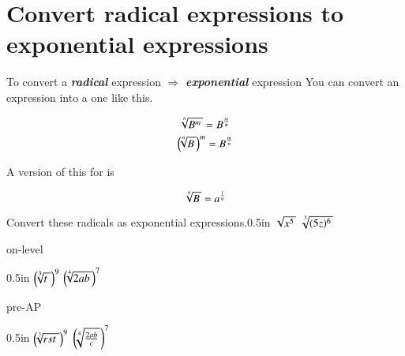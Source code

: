 \section*{Convert radical expressions to exponential expressions}

\begin{myConcept}{%
        To convert 
        a {\bfseries\itshape radical} expression 
        $\Longrightarrow$
        {\bfseries\itshape exponential} expression
    }%
    You can convert an  expression into a  one like this.
    \begin{myCenteredBox}[width=3in]
        \Large
        \[
            \myRoot[n]{B^m}
            =
            B ^ {\frac{m}{n}}
        \]
        \[
            \left(\hspace{-0.25em} \myRoot[n]{B} \right)^m
            =
            B ^ {\frac{m}{n}}
        \]
    \end{myCenteredBox}
    A version of this for  is
    \begin{myCenteredBox}[width=3in]
        \Large
        \[
            \myRoot[n]{B}
            =
            a ^ {\frac{1}{n}}
        \]
    \end{myCenteredBox}
\end{myConcept}




\begin{myProblems2}{Convert these radicals as exponential expressions.}{0.5in}
    {
        $\myRoot{x^5}$ 
    }
    {
        $\myRoot[3]{(5z)^6}$ 
    }
\end{myProblems2}




\begin{taggedblock}{on-level}
    \begin{myProblems2}{}{0.5in}
        {
            $\left(\hspace{-0.25em}   \myRoot[3]{t\,}   \right)^9$ 
        }
        {
            $\left(\hspace{-0.25em}   \myRoot[4]{2ab}   \right)^7$ 
        }
    \end{myProblems2}
\end{taggedblock}
\begin{taggedblock}{pre-AP}
    \begin{myProblems2}{}{0.5in}
        {
            $\left(\hspace{-0.25em}   \myRoot[3]{rst\,}   \right)^9$ 
        }
        {
            $\left(\hspace{-0.25em}   \myRoot[4]{\frac{2ab}{c}}   \right)^7$ 
        }
    \end{myProblems2}
\end{taggedblock}




